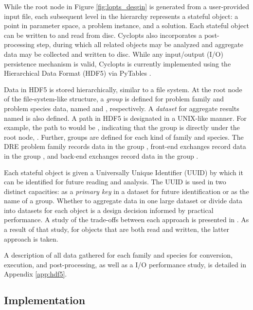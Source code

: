 While the root node in Figure \ref{fig:lopts_desgin} is generated from a
user-provided input file, each subsequent level in the hierarchy represents a
stateful object: a point in parameter space, a problem instance, and a
solution. Each stateful object can be written to and read from disc. Cyclopts
also incorporates a post-processing step, during which all related objects may
be analyzed and aggregate data may be collected and written to disc. While any
input/output (I/O) persistence mechanism is valid, Cyclopts is currently
implemented using the Hierarchical Data Format (HDF5) \cite{hdf5} via PyTables
\cite{pytables}.

Data in HDF5 is stored hierarchically, similar to a file system. At the root node
of the file-system-like structure, a \textit{group} is defined for problem family
and problem species data, named  and ,
respectively. A \textit{dataset} for aggregate results named  is
also defined. A path in HDF5 is designated in a UNIX-like manner. For example,
the path to  would be , indicating that the group is
directly under the root node, \code{/}. Further, groups are defined for each
kind of family and species. The DRE problem family records data in the group
, front-end exchanges record data in the group
, and back-end exchanges record data in the
group . 

Each stateful object is given a Universally Unique Identifier (UUID) by which it
can be identified for future reading and analysis. The UUID is used in two
distinct capacities: as a \textit{primary key} in a dataset for future
identification or as the name of a group. Whether to aggregate data in one large
dataset or divide data into datasets for each object is a design decision
informed by practical performance. A study of the trade-offs between each
approach is presented in . As a result of that
study, for objects that are both read and written, the latter approach is taken.

A description of all data gathered for each family and species for conversion,
execution, and post-processing, as well as a I/O performance study, is detailed
in Appendix \ref{app:hdf5}.

\subsection{Implementation}

